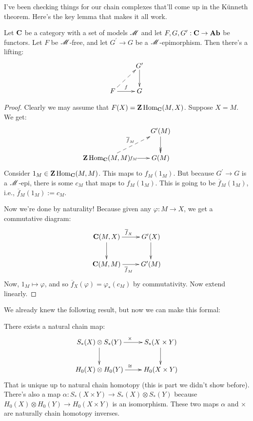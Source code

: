 I've been checking things for our chain complexes that'll come up in the K\"{u}nneth theorem. Here's the key lemma that makes it all work.
\begin{lemma}
Let $\mathbf C$ be a category with a set of models $\mathscr M$ and let $F,G,G^\prime:\mathbf C\to\mathbf{Ab}$ be functors. Let $F$ be $\mathscr M$-free, and let $G^\prime\to G$ be a $\mathscr M$-epimorphism. Then there's a lifting:
\begin{equation*}
\xymatrix{ & G^\prime\ar[d]\\
F\ar@{-->}[ur]\ar[r]^f & G}
\end{equation*}
\end{lemma}
\begin{proof}
Clearly we may assume that $F(X)=\mathbf Z\operatorname{Hom}_\mathbf C(M,X)$. Suppose $X=M$. We get:
\begin{equation*}
\xymatrix{ & G^\prime(M)\ar@{->>}[d]\\
\Z\Hom_\cc(M,M)\ar@{-->}[ur]^{\overline{f}_M}\ar[r]|{f_M} & G(M)}
\end{equation*}
Consider $1_M\in\mathbf Z\operatorname{Hom}_\mathbf C(M,M)$. This maps to $f_M(1_M)$. But because $G^\prime\to G$ is a $\mathscr M$-epi, there is some $c_M$ that maps to $f_M(1_M)$. This is going to be $\overline{f}_M(1_M)$, i.e., $\overline{f}_M(1_M):=c_M$.

Now we're done by naturality! Because given any $\varphi:M\to X$, we get a commutative diagram:
\begin{equation*}
\xymatrix{\cc(M,X)\ar[r]^{\overline{f}_X}\ar[d] & G^\prime(X)\ar[d]\\
\cc(M,M)\ar[r]_{\overline{f}_M} & G^\prime(M)}
\end{equation*}
Now, $1_M\mapsto\varphi$, and so $\overline{f}_X(\varphi)=\varphi_\ast(c_M)$ by commutativity. Now extend linearly.
\end{proof}
We already knew the following result, but now we can make this formal:
\begin{theorem}
There exists a natural chain map:
\begin{equation*}
\xymatrix{S_\ast(X)\otimes S_\ast(Y)\ar[r]^{\times}\ar[d] & S_\ast(X\times Y)\ar[d]\\
 H_0(X)\otimes H_0(Y)\ar[r]^{\cong} & H_0(X\times Y)}
\end{equation*}
That is unique up to natural chain homotopy (this is part we didn't show before). There's also a map $\alpha:S_\ast(X\times Y)\to S_\ast(X)\otimes S_\ast(Y)$ because $ H_0(X)\otimes H_0(Y)\to H_0(X\times Y)$ is an isomorphism. These two maps $\alpha$ and $\times$ are naturally chain homotopy inverses.
\end{theorem}
